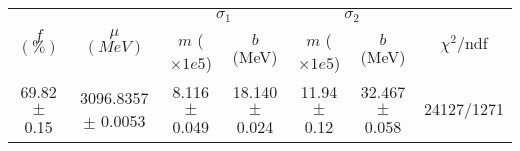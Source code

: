 \begin{tabular}{c|c|cc|cc||c}
 \multirow{2}{*}{$f$ $(\%)$} & \multirow{2}{*}{$\mu$ $(MeV)$} & \multicolumn{2}{|c|}{$\sigma_1$} & \multicolumn{2}{|c||}{$\sigma_2$} & \multirow{2}{*}{$\chi^2/$ndf} \\
 & & $m$ ($\times1e5$) & $b$ (MeV) & $m$ ($\times1e5$) & $b$ (MeV) & \\
\hline
69.82 $\pm$ 0.15 & 3096.8357 $\pm$ 0.0053 & 8.116 $\pm$ 0.049 & 18.140 $\pm$ 0.024 & 11.94 $\pm$ 0.12 & 32.467 $\pm$ 0.058 & 24127/1271\\
\end{tabular}
